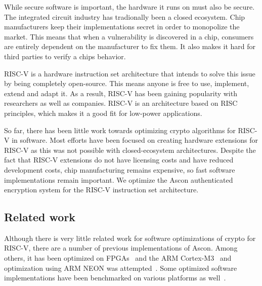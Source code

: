 While secure software is important, the hardware it runs on must also be secure.
The integrated circuit industry has tradionally been a closed ecosystem. Chip
manufacturers keep their implementations secret in order to monopolize the
market. This means that when a vulnerability is discovered in a chip, consumers
are entirely dependent on the manufacturer to fix them. It also makes it hard
for third parties to verify a chips behavior.

RISC-V is a hardware instruction set architecture that intends to solve this
issue by being completely open-source. This means anyone is free to use,
implement, extend and adapt it. As a result, RISC-V has been gaining popularity
with researchers as well as companies. RISC-V is an architecture based on RISC
principles, which makes it a good fit for low-power applications.

So far, there has been little work towards optimizing crypto algorithms for
RISC-V in software. Most efforts have been focused on creating hardware
extensions for RISC-V as this was not possible with closed-ecosystem
architectures. Despite the fact that RISC-V extensions do not have licensing
costs and have reduced development costs, chip manufacturing remains expensive,
so fast software implementations remain important. We optimize the Ascon
authenticated encryption system for the RISC-V instruction set architecture.

\subsection{Related work}

Although there is very little related work for software optimizations of crypto
for RISC-V, there are a number of previous implementations of Ascon. Among
others, it has been optimized on FPGAs~\cite{asconfpga} and the ARM
Cortex-M3~\cite{asconm3} and optimization using ARM NEON was
attempted~\cite{neon}. Some optimized software implementations have been
benchmarked on various platforms as well~\cite{benchmarkpaper}.
